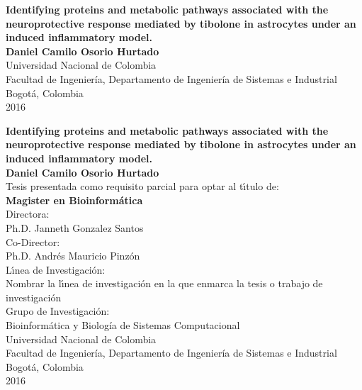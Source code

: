\begin{center}
\begin{figure}
\centering%
%
\end{figure}
\thispagestyle{empty} \vspace*{2.0cm} \textbf{\huge
Identifying proteins and metabolic pathways associated with the neuroprotective response mediated by tibolone in astrocytes under an induced inflammatory model.}\\[3.0cm]
\Large\textbf{Daniel Camilo Osorio Hurtado}\\[6.0cm]
\small Universidad Nacional de Colombia\\
Facultad de Ingeniería, Departamento de Ingeniería de Sistemas e Industrial\\
Bogotá, Colombia\\
2016\\
\end{center}

\newpage{\pagestyle{empty}\cleardoublepage}

\newpage
\begin{center}
\thispagestyle{empty} \vspace*{0cm} \textbf{\huge
Identifying proteins and metabolic pathways associated with the neuroprotective response mediated by tibolone in astrocytes under an induced inflammatory model.}\\[2.0cm]
\Large\textbf{Daniel Camilo Osorio Hurtado}\\[2.0cm]
\small Tesis presentada como requisito parcial para optar al
t\'{\i}tulo de:\\
\textbf{Magister en Bioinformática}\\[1.5cm]
Directora:\\
Ph.D. Janneth Gonzalez Santos\\[0.7cm]
Co-Director:\\
Ph.D. Andrés Mauricio Pinzón\\[1.5cm]
L\'{\i}nea de Investigaci\'{o}n:\\
Nombrar la l\'{\i}nea de investigaci\'{o}n en la que enmarca la tesis  o trabajo de investigaci\'{o}n\\
Grupo de Investigaci\'{o}n:\\
Bioinformática y Biología de Sistemas Computacional\\[2cm]
Universidad Nacional de Colombia\\
Facultad de Ingeniería, Departamento de Ingeniería de Sistemas e Industrial\\
Bogotá, Colombia\\
2016\\
\end{center}

